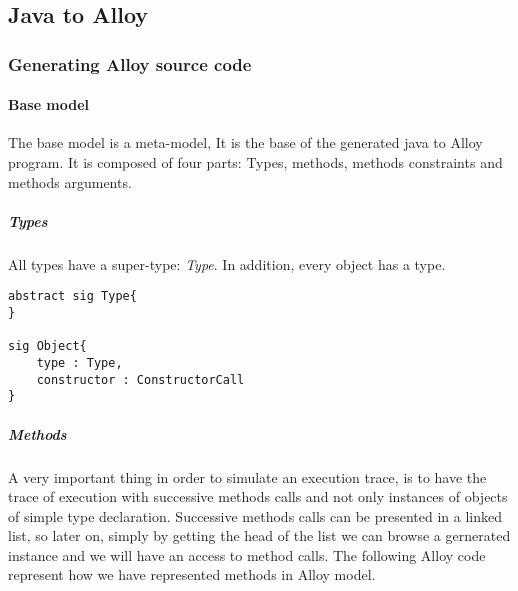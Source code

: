 \subsection{Java to Alloy}
\subsubsection{Generating Alloy source code}
\paragraph{Base model}
The base model is a meta-model, It is the base of the generated java to Alloy program.
It is composed of four parts: Types, methods, methods constraints and methods arguments.
\lstset{language=Alloy} 
\subparagraph{Types} All types have a super-type: \textit{Type}. In addition, every object has a type.
\begin{lstlisting}
abstract sig Type{
}

sig Object{
    type : Type,
    constructor : ConstructorCall
}
\end{lstlisting}
\subparagraph{Methods} A very important thing in order  to simulate an execution trace, is to have the trace of execution with successive methods calls and not only instances of objects of simple type declaration. Successive methods calls can be presented in a linked list, so later on, simply by getting the head of the list we can browse a gernerated instance and we will have an access to method calls. The following Alloy code represent how we have represented methods in Alloy model.

